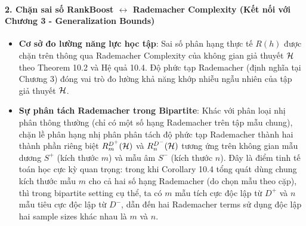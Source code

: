 \paragraph{2. Chặn sai số RankBoost $\leftrightarrow$ Rademacher Complexity (Kết nối với Chương 3 - Generalization Bounds)}
\begin{itemize}
    \item \textbf{Cơ sở đo lường năng lực học tập}: Sai số phân hạng thực tế $R(h)$ được chặn trên thông qua Rademacher Complexity của không gian giả thuyết $\mathcal{H}$ theo Theorem 10.2 và Hệ quả 10.4. Độ phức tạp Rademacher (định nghĩa tại Chương 3) đóng vai trò đo lường khả năng khớp nhiễu ngẫu nhiên của tập giả thuyết $\mathcal{H}$.
    \item \textbf{Sự phân tách Rademacher trong Bipartite}: Khác với phân loại nhị phân thông thường (chỉ có một số hạng Rademacher trên tập mẫu chung), chặn lề phân hạng nhị phân phân tách độ phức tạp Rademacher thành hai thành phần riêng biệt $R^{D^+}_m(\mathcal{H})$ và $R^{D^-}_n(\mathcal{H})$ tương ứng trên không gian mẫu dương $S^+$ (kích thước $m$) và mẫu âm $S^-$ (kích thước $n$). Đây là điểm tinh tế toán học cực kỳ quan trọng: trong khi Corollary 10.4 tổng quát dùng chung kích thước mẫu $m$ cho cả hai số hạng Rademacher (do chọn mẫu theo cặp), thì trong bipartite setting cụ thể, ta có $m$ mẫu tích cực độc lập từ $D^+$ và $n$ mẫu tiêu cực độc lập từ $D^-$, dẫn đến hai Rademacher terms sử dụng độc lập hai sample sizes khác nhau là $m$ và $n$.
\end{itemize}

